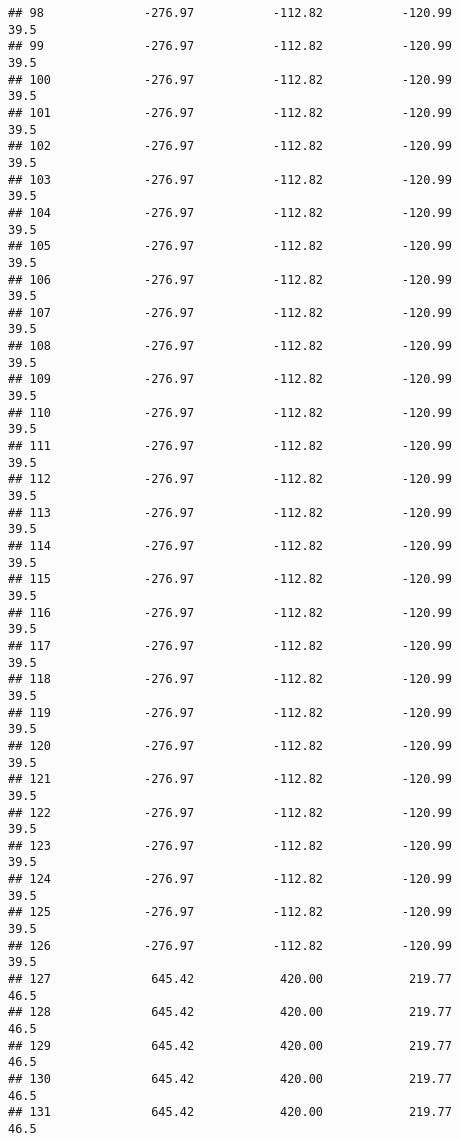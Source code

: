 \documentclass[]{article}
\begin{document}
\begin{verbatim}
## 98              -276.97           -112.82           -120.99           39.5
## 99              -276.97           -112.82           -120.99           39.5
## 100             -276.97           -112.82           -120.99           39.5
## 101             -276.97           -112.82           -120.99           39.5
## 102             -276.97           -112.82           -120.99           39.5
## 103             -276.97           -112.82           -120.99           39.5
## 104             -276.97           -112.82           -120.99           39.5
## 105             -276.97           -112.82           -120.99           39.5
## 106             -276.97           -112.82           -120.99           39.5
## 107             -276.97           -112.82           -120.99           39.5
## 108             -276.97           -112.82           -120.99           39.5
## 109             -276.97           -112.82           -120.99           39.5
## 110             -276.97           -112.82           -120.99           39.5
## 111             -276.97           -112.82           -120.99           39.5
## 112             -276.97           -112.82           -120.99           39.5
## 113             -276.97           -112.82           -120.99           39.5
## 114             -276.97           -112.82           -120.99           39.5
## 115             -276.97           -112.82           -120.99           39.5
## 116             -276.97           -112.82           -120.99           39.5
## 117             -276.97           -112.82           -120.99           39.5
## 118             -276.97           -112.82           -120.99           39.5
## 119             -276.97           -112.82           -120.99           39.5
## 120             -276.97           -112.82           -120.99           39.5
## 121             -276.97           -112.82           -120.99           39.5
## 122             -276.97           -112.82           -120.99           39.5
## 123             -276.97           -112.82           -120.99           39.5
## 124             -276.97           -112.82           -120.99           39.5
## 125             -276.97           -112.82           -120.99           39.5
## 126             -276.97           -112.82           -120.99           39.5
## 127              645.42            420.00            219.77           46.5
## 128              645.42            420.00            219.77           46.5
## 129              645.42            420.00            219.77           46.5
## 130              645.42            420.00            219.77           46.5
## 131              645.42            420.00            219.77           46.5

\end{verbatim}
\end{document}
